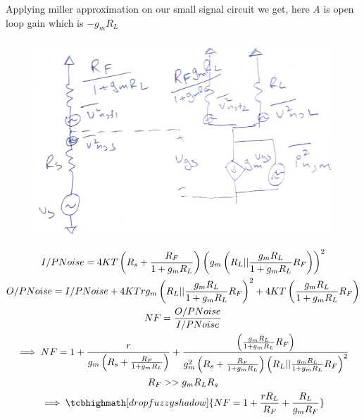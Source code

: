 \documentclass{article}
\begin{document}
Applying miller approximation on our small signal circuit we get, here \textit{A} is open loop gain which is $-g_mR_L$
\begin{figure}[H]
	\centering
	\includegraphics[scale=0.4]{./figs/3b.png}
\end{figure}
\begin{gather*}
	I/PNoise = 4KT\left(R_s + \frac{R_F}{1 + g_mR_L}\right)\left(g_m\left(R_L||\frac{g_mR_L}{1+g_mR_L}R_F\right)\right)^2\\
	O/PNoise = I/PNoise + 4KTrg_m\left(R_L||\frac{g_mR_L}{1+g_mR_L}R_F\right)^2 + 4KT\left(\frac{g_mR_L}{1+g_mR_L}R_F\right)\\
	NF = \frac{O/PNoise}{I/PNoise}\\
	\implies NF = 1 + \frac{r}{g_m\left(R_s + \frac{R_F}{1 + g_mR_L}\right)} + \frac{\left(\frac{g_mR_L}{1+g_mR_L}R_F\right)}{g_m^2\left(R_s + \frac{R_F}{1 + g_mR_L}\right)\left(R_L||\frac{g_mR_L}{1+g_mR_L}R_F\right)^2}\\
	R_F >> g_mR_LR_s\\
	\implies \tcbhighmath[drop fuzzy shadow]{NF = 1 + \frac{rR_L}{R_F}  + \frac{R_L}{g_mR_F}}
\end{gather*}
\end{document}
